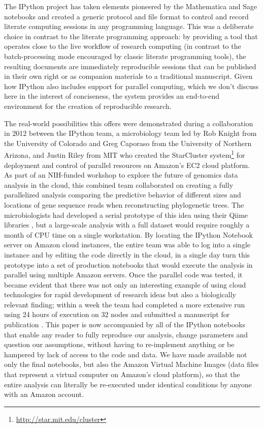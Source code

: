 \documentclass[ChapterTOCs,krantz2]{krantz} %
\begin{document}
The IPython project has taken elements pioneered by the Mathematica and Sage
notebooks and created a generic protocol and file format to control and record
literate computing sessions in any programming language.  This was a deliberate
choice in contrast to the literate programming approach: by providing a tool
that operates close to the live workflow of research computing (in contrast to
the batch-processing mode encouraged by classic literate programming tools),
the resulting documents are immediately reproducible sessions that can be
published in their own right or as companion materials to a traditional
manuscript.  Given how IPython also includes support for parallel computing,
which we don't discuss here in the interest of conciseness, the system provides
an end-to-end environment for the creation of reproducible research.

The real-world possibilities this offers were demonstrated during a
collaboration in 2012 between the IPython team, a microbiology team led by Rob
Knight from the University of Colorado and Greg Caporaso from the University of
Northern Arizona, and Justin Riley from MIT who created the StarCluster
system\footnote{\url{http://star.mit.edu/cluster}} for deployment and control
of parallel resources on Amazon's EC2 cloud platform.  As part of an NIH-funded
workshop to explore the future of genomics data analysis in the cloud, this
combined team collaborated on creating a fully parallelized analysis comparing
the predictive behavior of different sizes and locations of gene sequence reads
when reconstructing phylogenetic trees.  The microbiologists had developed a
serial prototype of this idea using their Qiime libraries
\cite{caporaso2010qiime}, but a large-scale analysis with a full dataset would
require roughly a month of CPU time on a single workstation.  By locating the
IPython Notebook server on Amazon cloud instances, the entire team was able to
log into a single instance and by editing the code directly in the cloud, in a
single day turn this prototype into a set of production notebooks that would
execute the analysis in parallel using multiple Amazon servers.  Once the
parallel code was tested, it became evident that there was not only an interesting
example of using cloud technologies for rapid development of research ideas but
also a biologically relevant finding; within a week the team had completed a
more extensive run using 24 hours of execution on 32 nodes and submitted a
manuscript for publication \cite{RWM+12}.  This paper is now accompanied by all
of the IPython notebooks that enable any reader to fully reproduce our
analysis, change parameters and question our assumptions, without having to
re-implement anything or be hampered by lack of access to the code
and data.  We have made available not only the final notebooks, but also the
Amazon Virtual Machine Images (data files that represent a virtual computer on
Amazon's cloud platform), so that the entire analysis can literally be
re-executed under identical conditions by anyone with an Amazon account.
\end{document}
